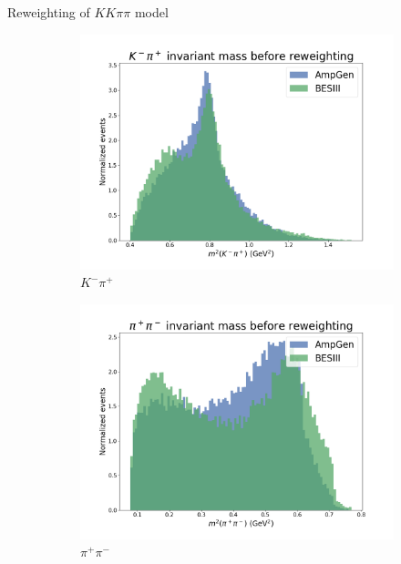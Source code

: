 \documentclass{beamer}
\begin{document}
\begin{frame}{Reweighting of \texorpdfstring{$KK\pi\pi$}{KKpipi} model}
\begin{figure}
\begin{subfigure}{0.33\textwidth}
      \centering
      \includegraphics[width=\textwidth]{Plots/s12_BeforeReweighting.png}
      \caption{$K^-\pi^+$}
    \end{subfigure}
    \begin{subfigure}{0.33\textwidth}
      \centering
      \includegraphics[width=\textwidth]{Plots/s23_BeforeReweighting.png}
      \caption{$\pi^+\pi^-$}
    \end{subfigure}%
    \begin{subfigure}{0.33\textwidth}
      \centering

\end{subfigure}
\end{figure}
\end{frame}
\end{document}
